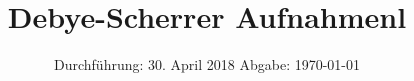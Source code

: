 

\subject{V-41}
\title{Debye-Scherrer Aufnahmenl}
\date{
  Durchführung: 30. April 2018
  \hspace{3em}
  Abgabe: \today
}



\maketitle
\thispagestyle{empty}
\tableofcontents
\newpage

% 
% 



\printbibliography



